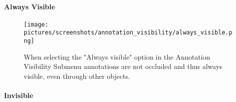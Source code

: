 \paragraph{Always Visible}
\begin{figure}%
	\texttt{[image: pictures/screenshots/annotation\_visibility/always\_visible.png]}
	\caption[Annotation always visible]{When selecting the "Always visible" option in the Annotation Visibility Submenu annotations are not occluded and thus always visible, 
	even through other objects.}
	\label{fig:always_visible}
\end{figure} 

\paragraph{Invisible}














